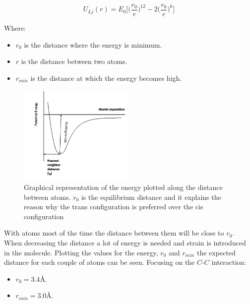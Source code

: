 	$$U_{Lj}(r) = E_0\biggl[\biggl(\frac{r_0}{r}\biggr)^{12}-2\biggl(\frac{r_0}{r}\biggr)^6\biggr]$$

	Where:

	\begin{multicols}{2}
		\begin{itemize}
			\item $r_0$ is the distance where the energy is minimum.
			\item $r$ is the distance between two atoms.
			\item $r_{min}$ is the distance at which the energy becomes high.
		\end{itemize}
	\end{multicols}

	\begin{figure}[H]

		\centering
		\includegraphics[width=0.5\textwidth]{potential.png}
		\caption{Graphical representation of the energy plotted along the distance between atoms. $r_0$ is the equilibrium distance and it explains the reason why the trans configuration is preferred over the cis configuration}
		\label{fig:potential}
	\end{figure}

	With atoms most of the time the distance between them will be close to $r_0$.
	When decreasing the distance a lot of energy is needed and strain is introduced in the molecule.
	Plotting the values for the energy, $r_0$ and $r_{min}$ the expected distance for each couple of atoms can be seen.
	Focusing on the $C$-$C$ interaction:

	\begin{multicols}{2}
		\begin{itemize}
			\item $r_0 = 3.4\si{\angstrom}$.
			\item $r_{min} = 3.0\si{\angstrom}$.
		\end{itemize}
	\end{multicols}

